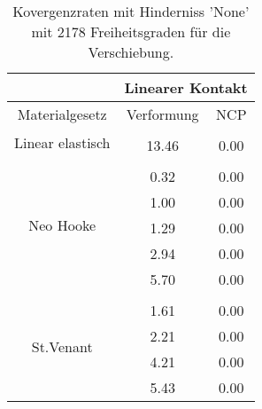 \begin{table} 
\centering 
\begin{tabular}{c|cc|} 
\cline{2-3} 
 & \multicolumn{2}{|c|}{Linearer Kontakt} \\ 
\hline 
\multicolumn{1}{|c|}{Materialgesetz} & \multicolumn{1}{c|}{Verformung} & \multicolumn{1}{c|}{NCP} \\ 
\hline 
\multicolumn{1}{|c|}{\multirow{2}{*}{Linear elastisch}} &\multicolumn{1}{|c|}{} & \multicolumn{1}{|c|}{} \\ 
\multicolumn{1}{|c|}{} & \multicolumn{1}{|c|}{     13.46} & \multicolumn{1}{|c|}{      0.00} \\ 
\hline 
\multicolumn{1}{|c|}{\multirow{6}{*}{Neo Hooke}} &\multicolumn{1}{|c|}{} & \multicolumn{1}{|c|}{} \\ 
\multicolumn{1}{|c|}{} & \multicolumn{1}{|c|}{      0.32} & \multicolumn{1}{|c|}{      0.00} \\ 
\multicolumn{1}{|c|}{} & \multicolumn{1}{|c|}{      1.00} & \multicolumn{1}{|c|}{      0.00} \\ 
\multicolumn{1}{|c|}{} & \multicolumn{1}{|c|}{      1.29} & \multicolumn{1}{|c|}{      0.00} \\ 
\multicolumn{1}{|c|}{} & \multicolumn{1}{|c|}{      2.94} & \multicolumn{1}{|c|}{      0.00} \\ 
\multicolumn{1}{|c|}{} & \multicolumn{1}{|c|}{      5.70} & \multicolumn{1}{|c|}{      0.00} \\ 
\hline 
\multicolumn{1}{|c|}{\multirow{5}{*}{St.Venant}} &\multicolumn{1}{|c|}{} & \multicolumn{1}{|c|}{} \\ 
\multicolumn{1}{|c|}{} & \multicolumn{1}{|c|}{      1.61} & \multicolumn{1}{|c|}{      0.00} \\ 
\multicolumn{1}{|c|}{} & \multicolumn{1}{|c|}{      2.21} & \multicolumn{1}{|c|}{      0.00} \\ 
\multicolumn{1}{|c|}{} & \multicolumn{1}{|c|}{      4.21} & \multicolumn{1}{|c|}{      0.00} \\ 
\multicolumn{1}{|c|}{} & \multicolumn{1}{|c|}{      5.43} & \multicolumn{1}{|c|}{      0.00} \\ 
\hline 
\end{tabular}\caption{Kovergenzraten mit Hinderniss 'None' mit 2178 Freiheitsgraden für die Verschiebung.}\label{tab:Rate_None_level4}
\end{table} 
